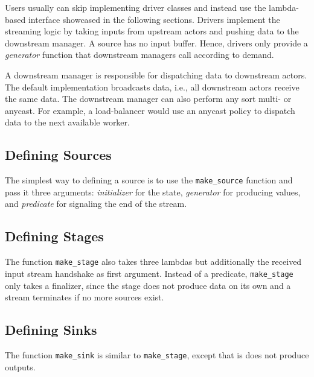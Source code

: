 Users usually can skip implementing driver classes and instead use the
lambda-based interface showcased in the following sections. Drivers implement
the streaming logic by taking inputs from upstream actors and pushing data to
the downstream manager. A source has no input buffer. Hence, drivers only
provide a \emph{generator} function that downstream managers call according to
demand.

A downstream manager is responsible for dispatching data to downstream actors.
The default implementation broadcasts data, i.e., all downstream actors receive
the same data. The downstream manager can also perform any sort multi- or
anycast. For example, a load-balancer would use an anycast policy to dispatch
data to the next available worker.

\clearpage

\subsection{Defining Sources}


The simplest way to defining a source is to use the \lstinline^make_source^
function and pass it three arguments: \emph{initializer} for the state,
\emph{generator} for producing values, and \emph{predicate} for signaling the
end of the stream.

\clearpage

\subsection{Defining Stages}


The function \lstinline^make_stage^ also takes three lambdas but additionally
the received input stream handshake as first argument. Instead of a predicate,
\lstinline^make_stage^ only takes a finalizer, since the stage does not produce
data on its own and a stream terminates if no more sources exist.

\clearpage

\subsection{Defining Sinks}


The function \lstinline^make_sink^ is similar to \lstinline^make_stage^, except
that is does not produce outputs.

